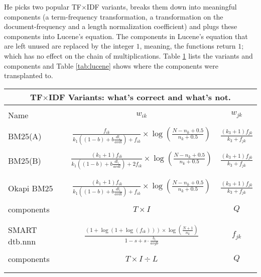 He picks two popular TF$\times$IDF variants, breaks them down into
meaningful components (a term-frequency transformation, a
transformation on the document-frequency and a length normalization
coefficient) and plugs these components into Lucene's equation. The
components in Lucene's equation that are left unused are replaced by
the integer $1$, meaning, the functions return $1$; which has no
effect on the chain of multiplications. Table \ref{tab:tfxidf} lists
the variants and components and Table \ref{tab:lucene} shows where the
components were transplanted to.

\begin{table}
  \centering
  \small
  \begin{minipage}[t]{0.65\textwidth}
    
    \begin{tabular}{lcc}
      \multicolumn{3}{c}{TF$\times$IDF Variants: what's correct and what's not.}\\
      \hline\hline
      \\
      Name & $w_{ik}$ & $w_{jk}$\\
      \hline
      \\
      BM25(A)
      & $\frac{f_{ik}}{k_{1}((1-b)+b\frac{dl_{i}}{avdl})+f_{ik}} \times \log(\frac{N-n_{k}+0.5}{n_{k}+0.5})$
      & $\frac{(k_{3}+1)f_{jk}}{k_{3}+f_{jk}}$ \\
      \\
      BM25(B)
      & $\frac{(k_{1}+1)f_{ik}}{k_{1}((1-b)+b\frac{dl_{i}}{avdl})+2f_{ik}} \times \log(\frac{N-n_{k}+0.5}{n_{k}+0.5})$
      & $\frac{(k_{3}+1)f_{jk}}{k_{3}+f_{jk}}$ \\
      \\\hline
      \\
      Okapi BM25
      & $\frac{(k_{1}+1)f_{ik}}{k_{1}((1-b)+b\frac{dl_{i}}{avdl})+f_{ik}} \times \log(\frac{N-n_{k}+0.5}{n_{k}+0.5})$
      & $\frac{(k_{3}+1)f_{jk}}{k_{3}+f_{jk}}$ \\
      \\
      components & $T \times I$ & $Q$ \\
      \\\hline
      \\
      SMART dtb.nnn
      & $\frac{(1+\log(1+\log(f_{ik}))) \times \log(\frac{N+1}{n_{k}})}{1-s+s \cdot \frac{b_{i}}{avgb}}$
      & $f_{jk}$ \\
      \\
      components & $T \times I \div L$ & $Q$ \\
      \\\hline\hline
      \label{tab:tfxidf}
    \end{tabular}
    

\end{minipage}
\end{table}
